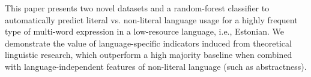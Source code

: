 This paper presents two novel datasets and a random-forest classifier to automatically predict literal vs. non-literal language usage for a highly frequent type of multi-word expression in a low-resource language, i.e., Estonian. We demonstrate the value of language-specific indicators induced from theoretical linguistic research, which outperform a high majority baseline when combined with language-independent features of non-literal language (such as abstractness).

